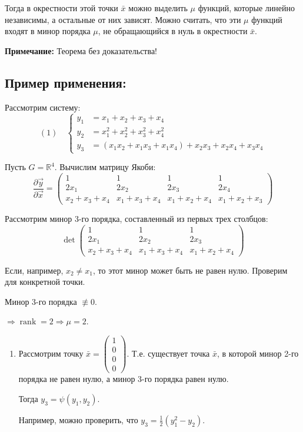 \documentclass{article}
\begin{document}
Тогда в окрестности этой точки $\bar{x}$ можно выделить $\mu$ функций, которые линейно независимы, а остальные от них зависят. Можно считать, что эти $\mu$ функций входят в минор порядка $\mu$, не обращающийся в нуль в окрестности $\bar{x}$.

\textbf{Примечание:} Теорема без доказательства!

\subsection*{Пример применения:}

Рассмотрим систему:
\[
(1) \quad
\left\{
\begin{aligned}
y_1 &= x_1 + x_2 + x_3 + x_4 \\
y_2 &= x_1^2 + x_2^2 + x_3^2 + x_4^2 \\
y_3 &= (x_1x_2 + x_1x_3 + x_1x_4) + x_2x_3 + x_2x_4 + x_3x_4
\end{aligned}
\right.
\]

Пусть $G = \mathbb{R}^4$. Вычислим матрицу Якоби:
\[
\frac{\partial \vec{y}}{\partial \vec{x}} =
\begin{pmatrix}
1 & 1 & 1 & 1 \\
2x_1 & 2x_2 & 2x_3 & 2x_4 \\
x_2+x_3+x_4 & x_1+x_3+x_4 & x_1+x_2+x_4 & x_1+x_2+x_3
\end{pmatrix}
\]

Рассмотрим минор 3-го порядка, составленный из первых трех столбцов:
\[
\det
\begin{pmatrix}
1 & 1 & 1 \\
2x_1 & 2x_2 & 2x_3 \\
x_2+x_3+x_4 & x_1+x_3+x_4 & x_1+x_2+x_4
\end{pmatrix}
\]

Если, например, $x_2 \neq x_1$, то этот минор может быть не равен нулю. Проверим для конкретной точки.

Минор 3-го порядка $\not\equiv 0$.

$\Rightarrow \operatorname{rank} = 2 \Rightarrow \mu = 2$.

\begin{enumerate}
    \item[2)] Рассмотрим точку $\bar{x} = \begin{pmatrix} 1 \\ 0 \\ 0 \\ 0 \end{pmatrix}$. Т.е. существует точка $\bar{x}$, в которой минор 2-го порядка не равен нулю, а минор 3-го порядка равен нулю.

    Тогда $y_3 = \psi(y_1, y_2)$.

    Например, можно проверить, что $y_3 = \frac{1}{2}(y_1^2 - y_2)$.
\end{enumerate}
\end{document}
